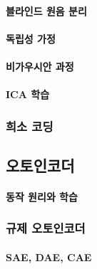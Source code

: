\documentclass [12pt] {oblivoir}
\let\oldsubsubsection=\subsubsection
\renewcommand{\subsubsection}
{
  \filbreak
  \oldsubsubsection
}
\begin{document}
\paragraph*{블라인드 원음 분리}\mbox{}

\vspace{3mm}

\paragraph*{독립성 가정}\mbox{}

\vspace{3mm}

\paragraph*{비가우시안 과정}\mbox{}

\vspace{3mm}

\paragraph*{ICA 학습}\mbox{}

\vspace{3mm}

\subsubsection{희소 코딩}

\subsection{오토인코더}

\paragraph*{동작 원리와 학습}\mbox{}

\vspace{3mm}

\subsubsection{규제 오토인코더}

\paragraph*{SAE, DAE, CAE}\mbox{}

\vspace{3mm}
\end{document}

